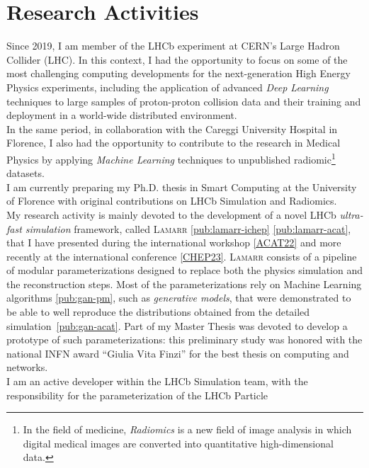 \section*{Research Activities}
\begin{cvcontent}
  \onehalfspacing
  Since 2019, I am member of the LHCb experiment at CERN's Large 
  Hadron Collider (LHC). In this context, I had the opportunity to 
  focus on some of the most challenging computing developments for 
  the next-generation High Energy Physics experiments, including the 
  application of advanced \emph{Deep Learning} techniques to large 
  samples of proton-proton collision data and their training and 
  deployment in a world-wide distributed environment.
  \\
  In the same period, in collaboration with the Careggi University 
  Hospital in Florence, 
  I also had the opportunity to contribute to the research in Medical 
  Physics by applying \emph{Machine Learning} techniques to unpublished 
  radiomic\footnote{In the field of medicine, \emph{Radiomics} is a new 
  field of image analysis in which digital medical images are converted 
  into quantitative high-dimensional data.} datasets.
  \\
  I am currently preparing my Ph.D. thesis in Smart Computing at 
  the University of Florence with original contributions on 
  LHCb Simulation and Radiomics.
  \\ [2mm]
  My research activity is mainly devoted to the development of a novel 
  LHCb \emph{ultra-fast simulation} framework, called \textsc{Lamarr}
  \ref{pub:lamarr-ichep} \ref{pub:lamarr-acat}, that I have presented
  during the international workshop \hyperlink{acat-2022}{[ACAT22]} 
  and more recently at the international conference \hyperlink{chep-2023}
  {[CHEP23]}. \textsc{Lamarr} consists of a pipeline of modular 
  parameterizations designed to replace 
  both the physics simulation and the reconstruction steps. Most of the 
  parameterizations rely on Machine Learning algorithms \ref{pub:gan-pm},
  such as \emph{generative models}, that were demonstrated to be 
  able to well reproduce the distributions obtained from the 
  detailed simulation~\ref{pub:gan-acat}. Part of my Master Thesis
  was devoted to develop a prototype of such parameterizations: this
  preliminary study was honored with the national INFN award
  ``Giulia Vita Finzi'' for the best thesis on computing and networks.
  \\ [2mm]
  I am an active developer within the LHCb Simulation team, with
  the responsibility for the parameterization of the LHCb Particle 

\end{cvcontent}
